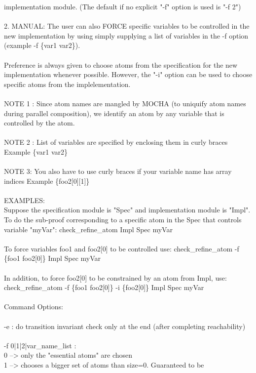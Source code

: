 {implementation module. (The default if no explicit "-f" option is used is "-f 2") \\
\\
2. MANUAL: The user can also FORCE specific variables to be controlled in
the new implementation by using simply supplying a list of variables in the -f
option (example -f \{var1 var2\}). \\
\\
Preference is always given to choose atoms from the specification for the new
implementation whenever possible. However, the "-i" option can be used to
choose specific atoms from the implelementation.  \\
\\
NOTE 1 : Since atom names are mangled by MOCHA (to uniquify atom
names during parallel composition), we identify an atom by any variable that is
controlled by the atom. \\
\\
NOTE 2 : List of variables are specified by enclosing them in curly braces
Example \{var1 var2\} \\
\\
NOTE 3: You also have to use curly braces if your variable name has array
indices Example \{foo2[0][1]\} \\
\\
EXAMPLES: \\
Suppose the specification module is "Spec" and implementation module is
"Impl". To do the sub-proof corresponding to a specific atom in the Spec that
controls variable "myVar": check\_refine\_atom Impl Spec myVar \\
\\
To force variables foo1 and foo2[0] to be controlled use: check\_refine\_atom
-f \{foo1 foo2[0]\} Impl Spec myVar \\
\\
In addition, to force foo2[0] to be constrained by an atom from Impl, use:
check\_refine\_atom -f \{foo1 foo2[0]\} -i \{foo2[0]\} Impl Spec myVar  \\
\\
Command Options: \\
\\
-e : do transition invariant check only at the end (after completing
     reachability) \\
\\
-f 0|1|2|var\_name\_list :\\
     0 --> only the "essential atoms" are chosen \\
     1 --> chooses a bigger set of atoms than size=0. Guaranteed to be
}
